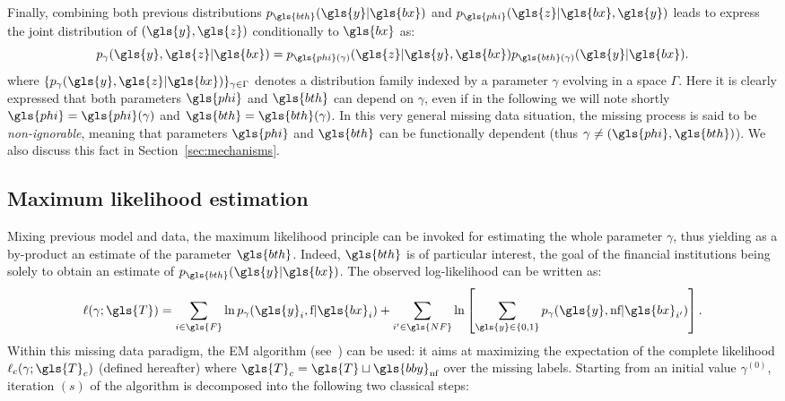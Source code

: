 Finally, combining both previous distributions $p_{\gls{bth}}(\gls{y}|\gls{bx})$ and $p_{\gls{phi}}(\gls{z}|\gls{bx},\gls{y})$ leads to express the joint distribution of $(\gls{y},\gls{z})$ conditionally to $\gls{bx}$ as:
\begin{equation}\label{eq:generative}
p_{\gamma}(\gls{y},\gls{z}|\gls{bx}) = p_{\gls{phi}(\gamma)}(\gls{z}|\gls{y},\gls{bx})p_{\gls{bth}(\gamma)}(\gls{y}|\gls{bx}).
\end{equation}
where $\{p_{\gamma}(\gls{y},\gls{z}|\gls{bx})\}_{\gamma \in \Gamma}$ denotes a distribution family indexed by a parameter $\gamma$ evolving in a space $\Gamma$. Here it is clearly expressed that both parameters $\gls{phi}$ and $\gls{bth}$ can depend on $\gamma$, even if in the following we will note shortly $\gls{phi}=\gls{phi}(\gamma)$ and $\gls{bth}=\gls{bth}(\gamma)$. In this very general missing data situation, the missing process is said to be {\it non-ignorable}, meaning that parameters $\gls{phi}$ and $\gls{bth}$ can be functionally dependent (thus $\gamma\neq (\gls{phi},\gls{bth})$). We also discuss this fact in Section~\ref{sec:mechanisms}.

\subsection{Maximum likelihood estimation} 
\label{sec:EM}

Mixing previous model and data, the maximum likelihood principle can be invoked for estimating the whole parameter $\gamma$, thus yielding as a by-product an estimate of the parameter $\gls{bth}$. Indeed, $\gls{bth}$ is of particular interest, the goal of the financial institutions being solely to obtain an estimate of $p_{\gls{bth}}(\gls{y}|\gls{bx})$. The observed log-likelihood can be written as:
\begin{equation}\label{eq:like.MNAR}
\ell(\gamma;\gls{T}) = \sum_{i\in\gls{F}}\ln p_{\gamma}(\gls{y}_i,\text{f} | \gls{bx}_i) + \sum_{i'\in\gls{NF}} \ln \left[ \sum_{\gls{y}\in\{0,1\}} p_{\gamma}(\gls{y},\text{nf} | \gls{bx}_{i'}) \right].
\end{equation}
Within this missing data paradigm, the EM algorithm (see~\cite{dempster1977maximum}) can be used: it aims at maximizing the expectation of the complete likelihood $\ell_c(\gamma;\gls{T}_c)$ (defined hereafter) where $\gls{T}_c = \gls{T} \sqcup \gls{bby}_{\text{nf}}$ over the missing labels. Starting from an initial value $\gamma^{(0)}$, iteration $(s)$ of the algorithm is decomposed into the following two classical steps:
